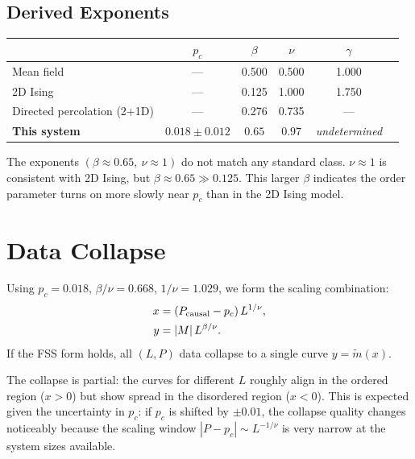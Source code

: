 \documentclass[12pt,a4paper]{article}
\begin{document}
\subsection{Derived Exponents}

\begin{center}
\begin{tabular}{lccccc}
\toprule
& $p_c$ & $\beta$ & $\nu$ & $\gamma$ \\
\midrule
Mean field         & ---   & 0.500 & 0.500 & 1.000 \\
2D Ising           & ---   & 0.125 & 1.000 & 1.750 \\
Directed percolation (2+1D) & --- & 0.276 & 0.735 & --- \\
\textbf{This system} & $\mathbf{0.018\pm0.012}$ & $\mathbf{0.65}$ & $\mathbf{0.97}$ & \textit{undetermined} \\
\bottomrule
\end{tabular}
\end{center}

The exponents $(\beta \approx 0.65,\ \nu \approx 1)$ do not match any standard class.
$\nu \approx 1$ is consistent with 2D Ising, but $\beta \approx 0.65 \gg 0.125$.
This larger $\beta$ indicates the order parameter turns on more slowly near $p_c$
than in the 2D Ising model.

\section{Data Collapse}

Using $p_c = 0.018$, $\beta/\nu = 0.668$, $1/\nu = 1.029$, we form
the scaling combination:
\begin{align}
x &= (P_{\rm causal} - p_c)\, L^{1/\nu}, \\
y &= |M|\, L^{\beta/\nu}.
\end{align}
If the FSS form holds, all $(L, P)$ data collapse to a single curve $y = \tilde{m}(x)$.

The collapse is partial: the curves for different $L$ roughly align in the ordered region
($x > 0$) but show spread in the disordered region ($x < 0$).
This is expected given the uncertainty in $p_c$:
if $p_c$ is shifted by $\pm 0.01$, the collapse quality changes noticeably
because the scaling window $|P - p_c| \sim L^{-1/\nu}$ is very narrow
at the system sizes available.

\end{document}
